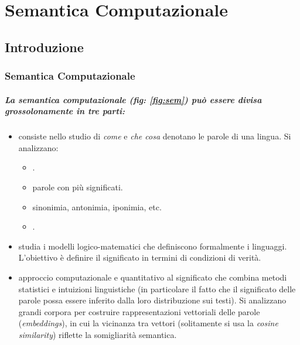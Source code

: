 \chapter{Semantica Computazionale}

\section{Introduzione}

\subsection{Semantica Computazionale}

\paragraph{La semantica computazionale (fig: \ref{fig:sem}) può essere divisa grossolonamente in tre parti:}

\begin{itemize}
  \item {} consiste nello studio di \textit{come} e \textit{che cosa} denotano le parole di una lingua. Si analizzano:
    \begin{itemize}
      \item {}. 
      \item {} parole con più significati.
      \item {} sinonimia, antonimia, iponimia, etc. 
      \item {}.
    \end{itemize}
  \item {} studia i modelli logico-matematici che definiscono formalmente i linguaggi. L'obiettivo è definire il significato in termini di condizioni di verità.
  \item {} approccio computazionale e quantitativo al significato che combina metodi statistici e intuizioni linguistiche (in particolare il fatto che il significato delle parole possa essere inferito dalla loro distribuzione sui testi). Si analizzano grandi corpora per costruire rappresentazioni vettoriali delle parole (\textit{embeddings}), in cui la vicinanza tra vettori (solitamente si usa la \textit{cosine similarity}) riflette la somigliarità semantica. 

\end{itemize}


